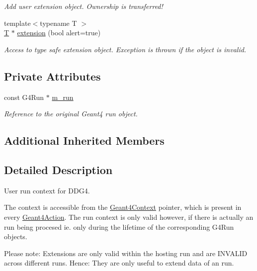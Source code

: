 \begin{DoxyCompactItemize}
\begin{DoxyCompactList}\small\item\em Add user extension object. Ownership is transferred! \end{DoxyCompactList}\item 
{\footnotesize template$<$typename T $>$ }\\\hyperlink{class_t}{T} $\ast$ \hyperlink{class_d_d4hep_1_1_simulation_1_1_geant4_run_ac70074dcc18216ef0a62fa1b646ff83f}{extension} (bool alert=true)
\begin{DoxyCompactList}\small\item\em Access to type safe extension object. Exception is thrown if the object is invalid. \end{DoxyCompactList}\end{DoxyCompactItemize}
\subsection*{Private Attributes}
\begin{DoxyCompactItemize}
\item 
const G4\+Run $\ast$ \hyperlink{class_d_d4hep_1_1_simulation_1_1_geant4_run_a9749412423798b1b248adc8c85acbcc1}{m\+\_\+run}
\begin{DoxyCompactList}\small\item\em Reference to the original Geant4 run object. \end{DoxyCompactList}\end{DoxyCompactItemize}
\subsection*{Additional Inherited Members}


\subsection{Detailed Description}
User run context for D\+D\+G4. 

The context is accessible from the \hyperlink{class_d_d4hep_1_1_simulation_1_1_geant4_context}{Geant4\+Context} pointer, which is present in every \hyperlink{class_d_d4hep_1_1_simulation_1_1_geant4_action}{Geant4\+Action}. The run context is only valid however, if there is actually an run being procesed ie. only during the lifetime of the corresponding G4\+Run objects.

Please note\+: Extensions are only valid within the hosting run and are I\+N\+V\+A\+L\+ID across different runs. Hence\+: They are only useful to extend data of an run.

